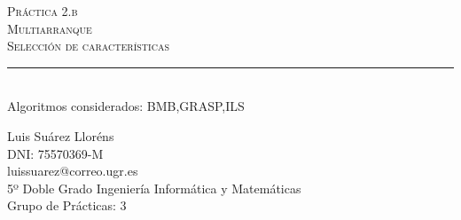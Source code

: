 \begin{titlepage}

\newcommand{\HRule}{\rule{\linewidth}{0.5mm}} %

\center %
 

\textsc{\LARGE Práctica 2.b}\\[1.0cm] %
\textsc{\Large Multiarranque}\\[0.5cm] %
\textsc{\large Selección de características}\\[0.5cm] %


\HRule \\[0.4cm]
{Algoritmos considerados: BMB,GRASP,ILS}\\[0.4cm] %

 

\begin{minipage}{1\textwidth}
\begin{flushleft} \large
Luis Suárez Lloréns\\
DNI: 75570369-M\\
luissuarez@correo.ugr.es\\
5º Doble Grado Ingeniería Informática y Matemáticas\\
Grupo de Prácticas: 3
\end{flushleft}
\end{minipage}




\end{titlepage}
